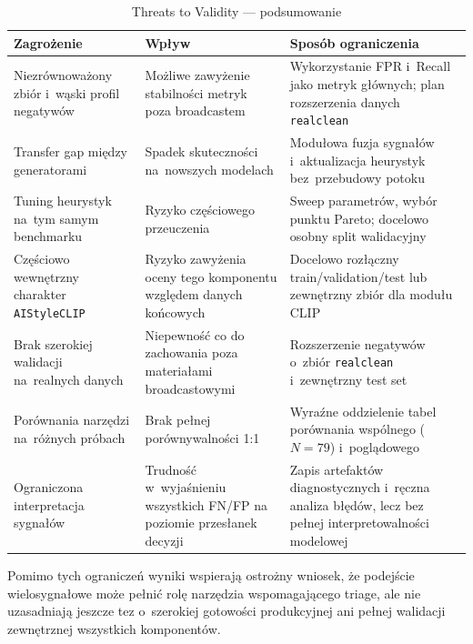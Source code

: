 \begin{table}[h]
\centering
\caption{Threats to Validity --- podsumowanie}
\label{tab:threats_summary}
\small
\begin{tabular}{L{4.6cm}L{4.5cm}L{5.8cm}}
\toprule
\textbf{Zagrożenie} & \textbf{Wpływ} & \textbf{Sposób ograniczenia} \\
\midrule
Niezrównoważony zbiór i~wąski profil negatywów &
Możliwe zawyżenie stabilności metryk poza broadcastem &
Wykorzystanie FPR i~Recall jako metryk głównych; plan rozszerzenia danych \texttt{realclean} \\
\addlinespace[2pt]
Transfer gap między generatorami &
Spadek skuteczności na~nowszych modelach &
Modułowa fuzja sygnałów i~aktualizacja heurystyk bez~przebudowy potoku \\
\addlinespace[2pt]
Tuning heurystyk na~tym samym benchmarku &
Ryzyko częściowego przeuczenia &
Sweep parametrów, wybór punktu Pareto; docelowo osobny split walidacyjny \\
\addlinespace[2pt]
Częściowo wewnętrzny charakter \texttt{AIStyleCLIP} &
Ryzyko zawyżenia oceny tego komponentu względem danych końcowych &
Docelowo rozłączny train/validation/test lub zewnętrzny zbiór dla modułu CLIP \\
\addlinespace[2pt]
Brak szerokiej walidacji na~realnych danych &
Niepewność co do zachowania poza materiałami broadcastowymi &
Rozszerzenie negatywów o~zbiór \texttt{realclean} i~zewnętrzny test set \\
\addlinespace[2pt]
Porównania narzędzi na~różnych próbach &
Brak pełnej porównywalności 1:1 &
Wyraźne oddzielenie tabel porównania wspólnego ($N=79$) i~poglądowego \\
\addlinespace[2pt]
Ograniczona interpretacja sygnałów &
Trudność w~wyjaśnieniu wszystkich FN/FP na poziomie przesłanek decyzji &
Zapis artefaktów diagnostycznych i~ręczna analiza błędów, lecz bez pełnej interpretowalności modelowej \\
\bottomrule
\end{tabular}
\end{table}

Pomimo tych ograniczeń wyniki wspierają ostrożny wniosek, że podejście
wielosygnałowe może pełnić rolę narzędzia wspomagającego triage,
ale nie uzasadniają jeszcze tez o~szerokiej gotowości produkcyjnej
ani pełnej walidacji zewnętrznej wszystkich komponentów.

